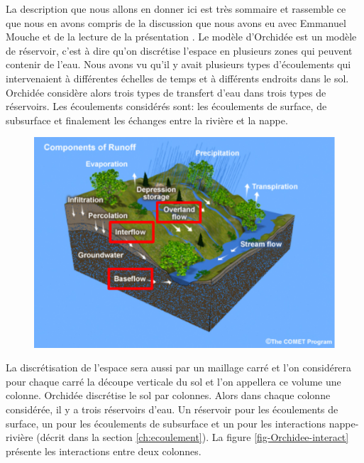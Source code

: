 \documentclass[a4paper,11pt]{article}
\numberwithin{equation}{section}
\begin{document}
La description que nous allons en donner ici est très sommaire et rassemble ce que nous en avons compris de la discussion que nous avons eu avec Emmanuel Mouche et de la lecture de la présentation \cite{gumiberteau2016}. Le modèle d'Orchidée est un modèle de réservoir, c'est à dire qu'on discrétise l'espace en plusieurs zones qui peuvent contenir de l'eau. Nous avons vu qu'il y avait plusieurs types d'écoulements qui intervenaient à différentes échelles de temps et à différents endroits dans le sol. Orchidée considère alors trois types de transfert d'eau dans trois types de réservoirs. Les écoulements considérés sont: les écoulements de surface, de subsurface et finalement les échanges entre la rivière et la nappe. 

\begin{figure}[H]
	\label{fig-HGS}
	\begin{center}
		\includegraphics[scale=0.3]{different_flows.png}
	\end{center}
\end{figure}

La discrétisation de l'espace sera aussi par un maillage carré et l'on considérera pour chaque carré la découpe verticale du sol et l'on appellera ce volume une colonne. Orchidée discrétise le sol par colonnes. Alors dans chaque colonne considérée, il y a trois réservoirs d'eau. Un réservoir pour les écoulements de surface, un pour les écoulements de subsurface et un pour les interactions nappe-rivière (décrit dans la section \ref{ch:ecoulement}). La figure \ref{fig-Orchidee-interact} présente les interactions entre deux colonnes.
\end{document}
